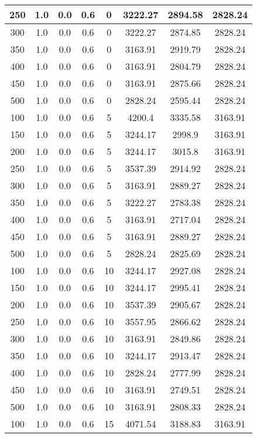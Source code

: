 \documentclass[a4paper, 12pt]{extreport}
\begin{document}
\begin{itemize}
\begin{longtable}{|c|c|c|c|c|c|c|c|}
			250 & 1.0 & 0.0 & 0.6 & 0 & 3222.27 & 2894.58 & 2828.24 \\\hline
			300 & 1.0 & 0.0 & 0.6 & 0 & 3222.27 & 2874.85 & 2828.24 \\\hline
			350 & 1.0 & 0.0 & 0.6 & 0 & 3163.91 & 2919.79 & 2828.24 \\\hline
			400 & 1.0 & 0.0 & 0.6 & 0 & 3163.91 & 2804.79 & 2828.24 \\\hline
			450 & 1.0 & 0.0 & 0.6 & 0 & 3163.91 & 2875.66 & 2828.24 \\\hline
			500 & 1.0 & 0.0 & 0.6 & 0 & 2828.24 & 2595.44 & 2828.24 \\\hline
			100 & 1.0 & 0.0 & 0.6 & 5 & 4200.4 & 3335.58 & 3163.91 \\\hline
			150 & 1.0 & 0.0 & 0.6 & 5 & 3244.17 & 2998.9 & 3163.91 \\\hline
			200 & 1.0 & 0.0 & 0.6 & 5 & 3244.17 & 3015.8 & 3163.91 \\\hline
			250 & 1.0 & 0.0 & 0.6 & 5 & 3537.39 & 2914.92 & 2828.24 \\\hline
			300 & 1.0 & 0.0 & 0.6 & 5 & 3163.91 & 2889.27 & 2828.24 \\\hline
			350 & 1.0 & 0.0 & 0.6 & 5 & 3222.27 & 2783.38 & 2828.24 \\\hline
			400 & 1.0 & 0.0 & 0.6 & 5 & 3163.91 & 2717.04 & 2828.24 \\\hline
			450 & 1.0 & 0.0 & 0.6 & 5 & 3163.91 & 2889.27 & 2828.24 \\\hline
			500 & 1.0 & 0.0 & 0.6 & 5 & 2828.24 & 2825.69 & 2828.24 \\\hline
			100 & 1.0 & 0.0 & 0.6 & 10 & 3244.17 & 2927.08 & 2828.24 \\\hline
			150 & 1.0 & 0.0 & 0.6 & 10 & 3244.17 & 2995.41 & 2828.24 \\\hline
			200 & 1.0 & 0.0 & 0.6 & 10 & 3537.39 & 2905.67 & 2828.24 \\\hline
			250 & 1.0 & 0.0 & 0.6 & 10 & 3557.95 & 2866.62 & 2828.24 \\\hline
			300 & 1.0 & 0.0 & 0.6 & 10 & 3163.91 & 2849.86 & 2828.24 \\\hline
			350 & 1.0 & 0.0 & 0.6 & 10 & 3244.17 & 2913.47 & 2828.24 \\\hline
			400 & 1.0 & 0.0 & 0.6 & 10 & 2828.24 & 2777.99 & 2828.24 \\\hline
			450 & 1.0 & 0.0 & 0.6 & 10 & 3163.91 & 2749.51 & 2828.24 \\\hline
			500 & 1.0 & 0.0 & 0.6 & 10 & 3163.91 & 2808.33 & 2828.24 \\\hline
			100 & 1.0 & 0.0 & 0.6 & 15 & 4071.54 & 3188.83 & 3163.91 \\\hline

\end{longtable}
\end{itemize}
\end{document}
